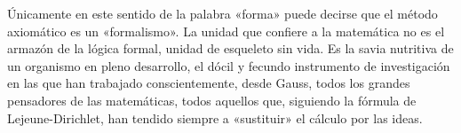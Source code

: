\documentclass[a4paper, 12pt, draft]{article}
\begin{document}
Únicamente en este sentido de la palabra «forma» puede decirse que el método axiomático es un «formalismo». La unidad que confiere a la matemática no es el armazón de la lógica formal, unidad de esqueleto sin vida. Es la savia nutritiva de un organismo en pleno desarrollo, el dócil y fecundo instrumento de investigación en las que han trabajado conscientemente, desde Gauss, todos los grandes pensadores de las matemáticas, todos aquellos que, siguiendo la fórmula de Lejeune-Dirichlet, han tendido siempre a «sustituir» el cálculo por las ideas.

\newpage

\theendnotes
\end{document}
